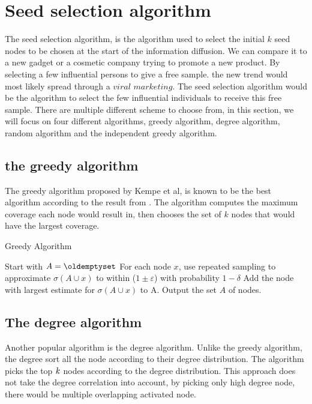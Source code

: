 {\section{Seed selection algorithm}
The seed selection algorithm, is the algorithm used to select the initial $k$ seed nodes to be chosen at the start of the information diffusion. We can compare it to a new gadget or a cosmetic company trying to promote a new product. By selecting a few influential persons to give a free sample. the new trend would most likely  spread through a $viral$ $marketing$\cite{ViralMarketing}. The seed selection algorithm would be the algorithm to select the few influential individuals to receive this free sample. There are multiple different scheme to choose from, in this section, we will focus on four different algorithms, greedy algorithm, degree algorithm, random algorithm and the independent greedy algorithm.

\subsection{the greedy algorithm}
The greedy algorithm\cite{MaximizeSpread2015} proposed by Kempe et al, is known to be the best algorithm according to the result from \cite{MaximizeSpread2015}. The algorithm computes the maximum coverage each node would result in, then chooses the set of $k$ nodes that would have the largest coverage.  

 \begin{algorithm}
\caption{Greedy Algorithm}
\begin{algorithmic}[1]
\State Start with $A = \oldemptyset$
\State For each node $x$, use repeated sampling to approximate $\sigma(A \cup {x}) $ to within ($1 \pm \varepsilon$) with probability
$1 − \delta$
\State Add the node with largest estimate for $\sigma(A \cup {x})$ to A.
\EndWhile
\State Output the set $A$ of nodes.
\end{algorithmic}
\end{algorithm}

\subsection{The degree algorithm}
Another popular algorithm is the degree algorithm\cite{MaximizeSpread2015}. Unlike the greedy algorithm, the degree sort all the node according to their degree distribution. The algorithm picks the top $\it{k}$ nodes according to the degree distribution. This approach does not take the degree correlation into account, by picking only high degree node, there would be multiple overlapping activated node.

}
